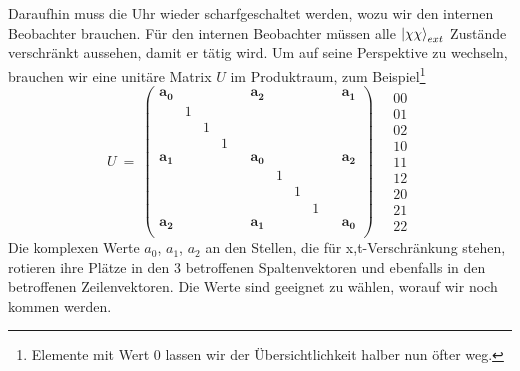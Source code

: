 \documentclass[12pt]{article}
\begin{document}
Daraufhin muss die Uhr wieder scharfgeschaltet werden, wozu wir den internen Beobachter brauchen. Für den internen Beobachter müssen alle $\ket{\chi\chi}_{ext}$ Zustände verschränkt aussehen, damit er tätig wird. Um auf seine Perspektive zu wechseln, brauchen wir eine unitäre Matrix $U$ im Produktraum, zum Beispiel\footnote{Elemente mit Wert 0 lassen wir der Übersichtlichkeit halber nun öfter weg.}
\begin{equation}
U\ =\ 
\begin{pmatrix}
\label{eq:U}
\pmb{a_0} &&&&& \pmb{a_2} &&&&& \pmb{a_1} \\
  & 1 &   &   &   &   &   &   &   &   &   \\
  &   & 1 &   &   &   &   &   &   &   &   \\
  &   &   & 1 &   &   &   &   &   &   &   \\
\pmb{a_1} &&&&& \pmb{a_0} &&&&& \pmb{a_2} \\
  &   &   &   &   &   & 1 &   &   &   &   \\
  &   &   &   &   &   &   & 1 &   &   &   \\
  &   &   &   &   &   &   &   & 1 &   &   \\
\pmb{a_2} &&&&& \pmb{a_1} &&&&& \pmb{a_0} \\
\end{pmatrix}
\quad
\begin{matrix}
00 \\ 01 \\ 02 \\ 10 \\ 11 \\ 12 \\ 20 \\ 21 \\ 22 
\end{matrix}
\end{equation}
Die komplexen Werte $a_0$, $a_1$, $a_2$ an den Stellen, die für x,t-Verschränkung stehen, rotieren ihre Plätze in den 3 betroffenen Spaltenvektoren und ebenfalls in den betroffenen Zeilenvektoren. Die Werte sind geeignet zu wählen, worauf wir noch kommen werden.
\end{document}
